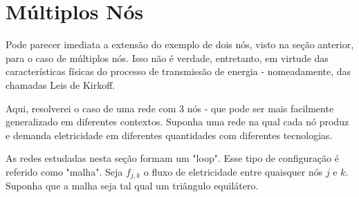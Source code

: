 \section{Múltiplos Nós}
Pode parecer imediata a extensão do exemplo de dois nós, visto na seção anterior, para o caso de múltiplos nós. Isso não é verdade, entretanto, em virtude das características físicas do processo de transmissão de energia - nomeadamente, das chamadas Leis de Kirkoff.

Aqui, resolverei o caso de uma rede com 3 nós - que pode ser mais facilmente generalizado em diferentes contextos. Suponha uma rede na qual cada nó produz e demanda eletricidade em diferentes quantidades com diferentes tecnologias. 

As redes estudadas nesta seção formam um "loop". Esse tipo de configuração é referido como "malha". Seja $f_{j,k}$ o fluxo de eletricidade entre quaisquer nós $j$ e $k$. Suponha que a malha seja tal qual um triângulo equilátero. 

